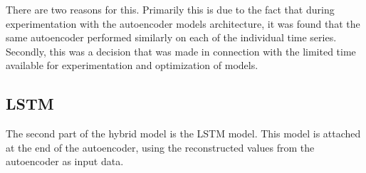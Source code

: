 There are two reasons for this.
Primarily this is due to the fact that during experimentation with the autoencoder models architecture,
it was found that the same autoencoder performed similarly on each of the individual time series.
Secondly, this was a decision that was made in connection with the limited time available for experimentation and optimization of models.



\subsection{LSTM}

The second part of the hybrid model is the LSTM model.
This model is attached at the end of the autoencoder,
using the reconstructed values from the autoencoder as input data.




